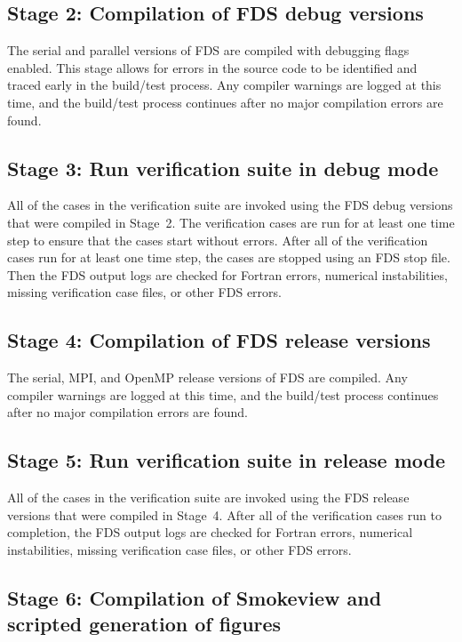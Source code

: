 \documentclass[11pt]{book}
\begin{document}
\subsection*{Stage 2: Compilation of FDS debug versions}

The serial and parallel versions of FDS are compiled with debugging flags enabled. This stage allows for errors in the source code to be identified and traced early in the build/test process. Any compiler warnings are logged at this time, and the build/test process continues after no major compilation errors are found.

\subsection*{Stage 3: Run verification suite in debug mode}

All of the cases in the verification suite are invoked using the FDS debug versions that were compiled in Stage~2. The verification cases are run for at least one time step to ensure that the cases start without errors. After all of the verification cases run for at least one time step, the cases are stopped using an FDS stop file. Then the FDS output logs are checked for Fortran errors, numerical instabilities, missing verification case files, or other FDS errors.

\subsection*{Stage 4: Compilation of FDS release versions}

The serial, MPI, and OpenMP release versions of FDS are compiled. Any compiler warnings are logged at this time, and the build/test process continues after no major compilation errors are found.

\subsection*{Stage 5: Run verification suite in release mode}

All of the cases in the verification suite are invoked using the FDS release versions that were compiled in Stage~4. After all of the verification cases run to completion, the FDS output logs are checked for Fortran errors, numerical instabilities, missing verification case files, or other FDS errors.

\subsection*{Stage 6: Compilation of Smokeview and scripted generation of figures}
\end{document}
